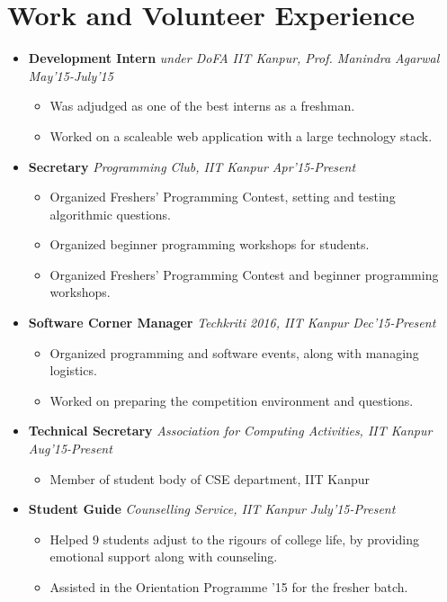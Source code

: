 \documentclass[11pt,a4paper]{moderncv}
\newcommand{\experience}[4]{
  \vspace{0.1cm}
\item \textbf{\large{#1}} \emph{#2} \hfill \textit{#3}
  \begin{itemize}[leftmargin=*]
    \setlength\itemsep{0em} #4
  \end{itemize}
}
\newcommand{\onepage}[1]{
  \ifdefined\onep
  #1
  \fi
}
\newcommand{\twopage}[1]{
  \ifdefined\twop
  #1
  \fi
}
\newcommand{\secspace}{
  \onepage{\vspace{-0.27cm}}
  \twopage{\vspace{-0.07cm}}
}
\newcommand{\secbelow}{
  \onepage{\vspace{-0.07cm}}
}
\begin{document}
\section*{Work and Volunteer Experience}
\secbelow
\begin{itemize}
  \twopage{\setlength\itemsep{0.5em}}
  \experience{Development Intern}{under DoFA IIT Kanpur, Prof. Manindra Agarwal}{May'15-July'15}{
  \item Was adjudged as one of the best interns as a freshman.
  \item Worked on a scaleable web application with a large technology stack.
  }

  \experience{Secretary}{Programming Club, IIT Kanpur}{Apr'15-Present}{
    \twopage{
    \item Organized Freshers' Programming Contest, setting and testing algorithmic questions.
    \item Organized beginner programming workshops for students.
    }
  \item Organized Freshers' Programming Contest and beginner programming workshops.
  }

  \twopage{
    \experience{Software Corner Manager}{Techkriti 2016, IIT Kanpur}{Dec'15-Present}{
    \item Organized programming and software events, along with managing logistics.
    \item Worked on preparing the competition environment and
      questions.
    }
  }

  \experience{Technical Secretary}{Association for Computing Activities, IIT Kanpur}{Aug'15-Present}{
  \item Member of student body of CSE department, IIT Kanpur
  }
  
  \twopage{
    \experience{Student Guide}{Counselling Service, IIT Kanpur}{July'15-Present}{
    \item Helped 9 students adjust to the rigours of college life, by providing emotional support along with counseling.
    \item Assisted in the Orientation Programme '15 for the fresher batch.
    }
  }

\end{itemize}

\secspace
\end{document}
